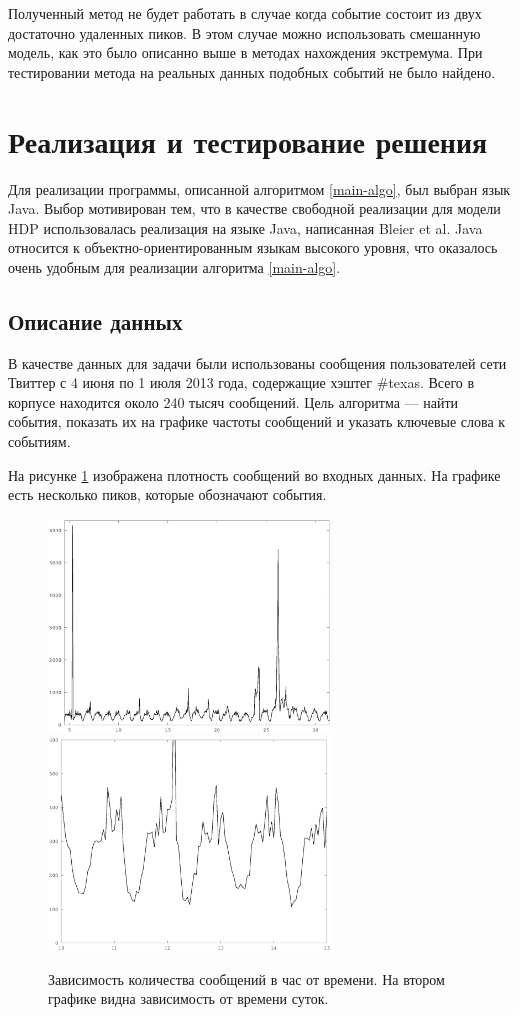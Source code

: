 \documentclass[12pt, a4paper]{article}
\begin{document}
  Полученный метод не будет работать в случае когда событие состоит из двух достаточно удаленных пиков. В этом случае можно использовать смешанную модель, как это было описанно выше в методах нахождения экстремума. При тестировании метода на реальных данных подобных событий не было найдено\cite{blei-sd}.
  

  \section{Реализация и тестирование решения}
  Для реализации программы, описанной алгоритмом \ref{main-algo}, был выбран язык Java. Выбор мотивирован тем, что в качестве свободной реализации для модели HDP использовалась реализация на языке Java, написанная Bleier et al\cite{hdp-2}. Java относится к объектно-ориентированным языкам высокого уровня, что оказалось очень удобным для реализации алгоритма \ref{main-algo}.
  
  \subsection{Описание данных}
  В качестве данных для задачи были использованы сообщения пользователей сети Твиттер с 4 июня по 1 июля 2013 года, содержащие хэштег \#texas. Всего в корпусе находится около 240 тысяч сообщений. Цель алгоритма --- найти события, показать их на графике частоты сообщений и указать ключевые слова к событиям.
  
  На рисунке \ref{fig:all-freq} изображена плотность сообщений во входных данных. На графике есть несколько пиков, которые обозначают события. 
  \begin{figure}[H]
  \centering
  \includegraphics[width=7.5cm]{all-freq.eps}
  \includegraphics[width=7.5cm]{all-freq-scaled.eps}
  \caption{Зависимость количества сообщений в час от времени. На втором графике видна зависимость от времени суток.}
  \label{fig:all-freq}
  \end{figure}
  
\end{document}
